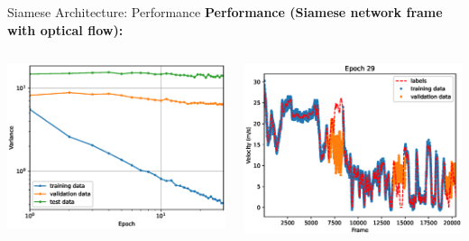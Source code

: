 \begin{frame}{Siamese Architecture: Performance}
	\textbf{Performance (Siamese network frame with optical flow):}
	\begin{columns}[c]
		\begin{column}{0.5\textwidth}
			\includegraphics[width=\textwidth]{imgs/siamese_fof_trainingprocess.eps}
		\end{column}
		\begin{column}{0.5\textwidth}
			\includegraphics[width=\textwidth]{imgs/siamese_fof_performance.eps}
		\end{column}
	\end{columns}
\end{frame}

